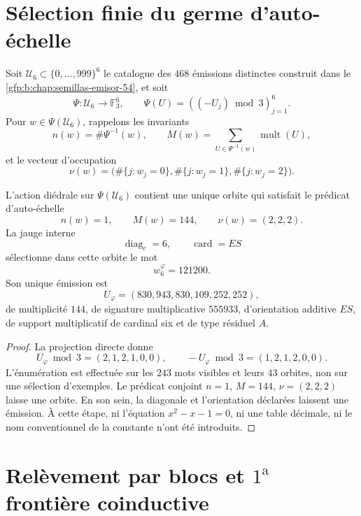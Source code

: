 
\label{gfp:b:chap:biografia-completa-phi}

\section{Sélection finie du germe d’auto-échelle}

Soit \(\mathcal U_6\subset\{0,\ldots,999\}^6\) le catalogue des
\(468\) émissions distinctes construit dans le
\cref{gfp:b:chap:semillas-emisor-54}, et soit
\[
 \Psi:\mathcal U_6\longrightarrow\mathbb F_3^6,
 \qquad
 \Psi(U)=((-U_j)\bmod3)_{j=1}^{6}.
\]
Pour \(w\in\Psi(\mathcal U_6)\), rappelons les invariants
\[
 n(w)=\#\Psi^{-1}(w),
 \qquad
 M(w)=\sum_{U\in\Psi^{-1}(w)}\operatorname{mult}(U),
\]
et le vecteur d’occupation
\[
 \nu(w)=
 \bigl(\#\{j:w_j=0\},\#\{j:w_j=1\},\#\{j:w_j=2\}\bigr).
\]

\begin{theorem}
\label{gfp:b:thm:seleccion-orbital-phi}
L’action diédrale sur \(\Psi(\mathcal U_6)\) contient une unique orbite
qui satisfait le prédicat d’auto-échelle
\[
 n(w)=1,
 \qquad
 M(w)=144,
 \qquad
 \nu(w)=(2,2,2).
\]
La jauge interne
\[
 \operatorname{diag}_c=6,
 \qquad
 \operatorname{card}=ES
\]
sélectionne dans cette orbite le mot
\[
 \boxed{w_6^{\varphi}=121200.}
\]
Son unique émission est
\[
 \boxed{U_{\varphi}=(830,943,830,109,252,252),}
\]
de multiplicité \(144\), de signature multiplicative \(555933\), d’orientation
additive \(ES\), de support multiplicatif de cardinal six et de type résiduel
\(A\).
\end{theorem}

\begin{proof}
La projection directe donne
\[
 U_{\varphi}\bmod3=(2,1,2,1,0,0),
 \qquad
 -U_{\varphi}\bmod3=(1,2,1,2,0,0).
\]
L’énumération est effectuée sur les \(243\) mots visibles et leurs
\(43\) orbites, non sur une sélection d’exemples. Le prédicat conjoint
\(n=1\), \(M=144\), \(\nu=(2,2,2)\) laisse une orbite. En son sein, la
diagonale et l’orientation déclarées laissent une émission. À cette étape,
ni l’équation \(x^2-x-1=0\), ni une table décimale, ni le nom
conventionnel de la constante n’ont été introduits.
\end{proof}

\section{Relèvement par blocs et \(1^{\mathrm a}\) frontière coinductive}

